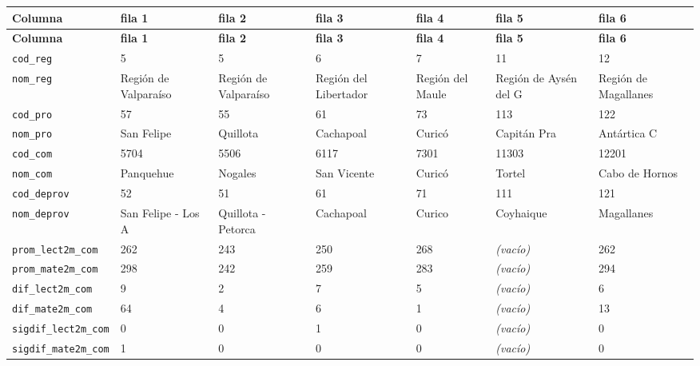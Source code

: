 \documentclass[10pt]{article}
\newcommand{\hdr}[1]{\textbf{\color{white}#1}}
\begin{document}
\footnotesize
\begin{xltabular}{\linewidth}{@{}p{4.3cm} Y Y Y Y Y Y @{}}
\hdr{Columna} & \hdr{fila 1} & \hdr{fila 2} & \hdr{fila 3} & \hdr{fila 4} & \hdr{fila 5} & \hdr{fila 6} \\
\endfirsthead
{}\hdr{Columna} & \hdr{fila 1} & \hdr{fila 2} & \hdr{fila 3} & \hdr{fila 4} & \hdr{fila 5} & \hdr{fila 6} \\
\endhead
{}\texttt{cod\_\allowbreak{}reg} & 5 & 5 & 6 & 7 & 11 & 12 \\
\texttt{nom\_\allowbreak{}reg} & Región de Valparaíso & Región de Valparaíso & Región del Libertador & Región del Maule & Región de Aysén del G & Región de Magallanes \\
\texttt{cod\_\allowbreak{}pro} & 57 & 55 & 61 & 73 & 113 & 122 \\
\texttt{nom\_\allowbreak{}pro} & San Felipe & Quillota & Cachapoal & Curicó & Capitán Pra & Antártica C \\
\texttt{cod\_\allowbreak{}com} & 5704 & 5506 & 6117 & 7301 & 11303 & 12201 \\
\texttt{nom\_\allowbreak{}com} & Panquehue & Nogales & San Vicente & Curicó & Tortel & Cabo de Hornos \\
\texttt{cod\_\allowbreak{}deprov} & 52 & 51 & 61 & 71 & 111 & 121 \\
\texttt{nom\_\allowbreak{}deprov} & San Felipe -{} Los A & Quillota -{} Petorca & Cachapoal & Curico & Coyhaique & Magallanes \\
\texttt{prom\_\allowbreak{}lect2m\_\allowbreak{}com} & 262 & 243 & 250 & 268 & \textit{\color{gris}(vacío)} & 262 \\
\texttt{prom\_\allowbreak{}mate2m\_\allowbreak{}com} & 298 & 242 & 259 & 283 & \textit{\color{gris}(vacío)} & 294 \\
\texttt{dif\_\allowbreak{}lect2m\_\allowbreak{}com} & 9 & 2 & 7 & 5 & \textit{\color{gris}(vacío)} & 6 \\
\texttt{dif\_\allowbreak{}mate2m\_\allowbreak{}com} & 64 & 4 & 6 & 1 & \textit{\color{gris}(vacío)} & 13 \\
\texttt{sigdif\_\allowbreak{}lect2m\_\allowbreak{}com} & 0 & 0 & 1 & 0 & \textit{\color{gris}(vacío)} & 0 \\
\texttt{sigdif\_\allowbreak{}mate2m\_\allowbreak{}com} & 1 & 0 & 0 & 0 & \textit{\color{gris}(vacío)} & 0 \\

\end{xltabular}
\end{document}
